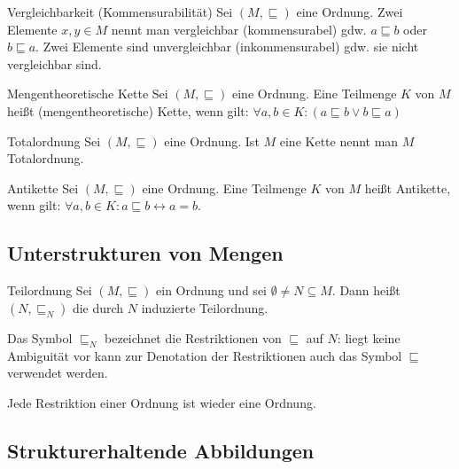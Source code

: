 \documentclass{scrartcl}
\begin{document}
\begin{definition}{Vergleichbarkeit (Kommensurabilität)}
Sei $(M, ⊑)$ eine Ordnung. Zwei Elemente $x, y ∈ M$ nennt man vergleichbar
(kommensurabel) gdw. $a ⊑ b$ oder $b ⊑ a$.
Zwei Elemente sind unvergleichbar (inkommensurabel) gdw. sie nicht vergleichbar
sind.
\end{definition}


\begin{definition}{Mengentheoretische Kette}
Sei $(M,⊑)$ eine Ordnung. Eine Teilmenge $K$ von $M$ heißt (mengentheoretische)
Kette, wenn gilt: $∀ a, b ∈ K: (a ⊑ b ∨ b ⊑ a)$
\end{definition}

\begin{definition}{Totalordnung}
Sei $(M,⊑)$ eine Ordnung. Ist $M$ eine Kette nennt man $M$ Totalordnung.
\end{definition}


\begin{definition}{Antikette}
Sei $(M,⊑)$ eine Ordnung. Eine Teilmenge $K$ von $M$ heißt Antikette,
wenn gilt: $∀ a, b ∈ K: a ⊑ b ↔ a = b$.
\end{definition}




\subsection{Unterstrukturen von Mengen}

\begin{definition}{Teilordnung}
Sei $(M, ⊑)$ ein Ordnung und sei $∅ ≠ N ⊆ M$.
Dann heißt $(N, ⊑_N)$ die durch $N$ induzierte Teilordnung.
\end{definition}

\begin{remark}[Restriktion]
Das Symbol $⊑_N$ bezeichnet die Restriktionen von $⊑$ auf $N$:
liegt keine Ambiguität vor kann zur Denotation der
Restriktionen auch das Symbol $⊑$ verwendet werden.
\end{remark}

\begin{remark}
Jede Restriktion einer Ordnung ist wieder eine Ordnung.
\end{remark}


\subsection{Strukturerhaltende Abbildungen}
\end{document}
